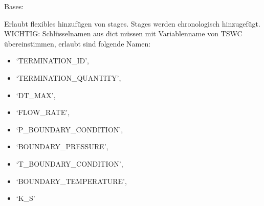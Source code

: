\documentclass[letterpaper,10pt,english]{sphinxmanual}
\begin{document}
\begin{fulllineitems}
\label{\detokenize{tscw_module:tscw_module.tscw_DataClassesInput.GacaProcessData}}
\pysigstartsignatures
{}
\pysigstopsignatures
\sphinxAtStartPar
Bases: 

\begin{fulllineitems}
\label{\detokenize{tscw_module:tscw_module.tscw_DataClassesInput.GacaProcessData.add_stage}}
\pysigstartsignatures
{}
\pysigstopsignatures
\sphinxAtStartPar
Erlaubt flexibles hinzufügen von stages. Stages werden chronologisch hinzugefügt.
WICHTIG: Schlüsselnamen aus dict müssen mit Variablenname von TSWC übereinstimmen, erlaubt sind folgende Namen:
\begin{itemize}
\item {} 
\sphinxAtStartPar
‘TERMINATION\_ID’,

\item {} 
\sphinxAtStartPar
‘TERMINATION\_QUANTITY’,

\item {} 
\sphinxAtStartPar
‘DT\_MAX’,

\item {} 
\sphinxAtStartPar
‘FLOW\_RATE’,

\item {} 
\sphinxAtStartPar
‘P\_BOUNDARY\_CONDITION’,

\item {} 
\sphinxAtStartPar
‘BOUNDARY\_PRESSURE’,

\item {} 
\sphinxAtStartPar
‘T\_BOUNDARY\_CONDITION’,

\item {} 
\sphinxAtStartPar
‘BOUNDARY\_TEMPERATURE’,

\item {} 
\sphinxAtStartPar
‘K\_S’


\end{itemize}
\end{fulllineitems}
\end{fulllineitems}
\end{document}
